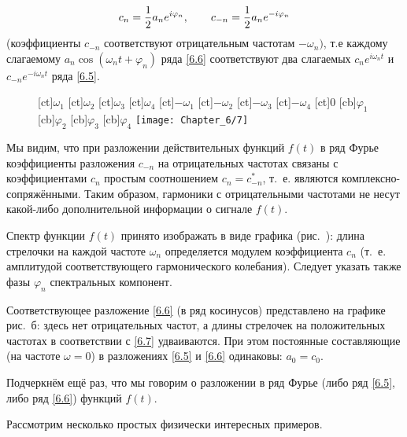 \begin{equation}
	\eqmark{6.7}
	c_n =\frac{1}{2}a_n e^{i\varphi_n}, \qquad c_{-n}=\frac{1}{2}a_n e^{-i\varphi_n}
\end{equation}
(коэффициенты $c_{-n}$ соответствуют отрицательным частотам $-\omega_n)$, т.е каждому слагаемому $a_n\cos(\omega_nt+\varphi_n)$
ряда \eqref{6.6} соответствуют два слагаемых $c_ne^{i\omega_n t}$ и $c_{-n}e^{-i\omega_n t}$ ряда \eqref{6.5}.

\begin{wrapfigure}{r}{0.35\textwidth}
	[ct]{$\omega_1$}
	[ct]{$\omega_2$}
	[ct]{$\omega_3$}
	[ct]{$\omega_4$}
	[ct]{$-\omega_{1}$}
	[ct]{$-\omega_{2}$}
	[ct]{$-\omega_{3}$}
	[ct]{$-\omega_{4}$}
	[ct]{0}
	[cb]{$\varphi_1$}
	[cb]{$\varphi_2$}
	[cb]{$\varphi_3$}
	[cb]{$\varphi_4$}
	\texttt{[image: Chapter\_6/7]}
	\caption{}
\end{wrapfigure}

Мы видим, что при разложении действительных функций $f(t)$ в ряд Фурье коэффициенты разложения $c_{-n}$ на отрицательных
частотах связаны с коэффициентами $c_n$ простым соотношением $c_n=c_{-n}^*$, т.~е. являются комплексно-сопряжёнными.
Таким образом, гармоники с отрицательными частотами не несут какой-либо дополнительной информации о сигнале $f(t)$.

Спектр функции $f(t)$ принято изображать в виде графика (рис.~): длина стрелочки на каждой частоте $\omega_n$ определяется
модулем коэффициента $c_n$ (т.~е. амплитудой соответствующего гармонического колебания). Следует указать также фазы
$\varphi_n$ спектральных компонент.

Соответствующее разложение \eqref{6.6} (в ряд косинусов) представлено на графике рис.~б: здесь нет отрицательных частот, а
длины стрелочек на положительных частотах в соответствии с \eqref{6.7} удваиваются. При этом постоянные составляющие (на
частоте $\omega=0$) в разложениях \eqref{6.5} и \eqref{6.6} одинаковы: $a_0=c_0$.

Подчеркнём ещё раз, что мы говорим о разложении в ряд Фурье (либо ряд \eqref{6.5}, либо ряд \eqref{6.6}) 
функций $f(t)$.

Рассмотрим несколько простых физически интересных примеров.


